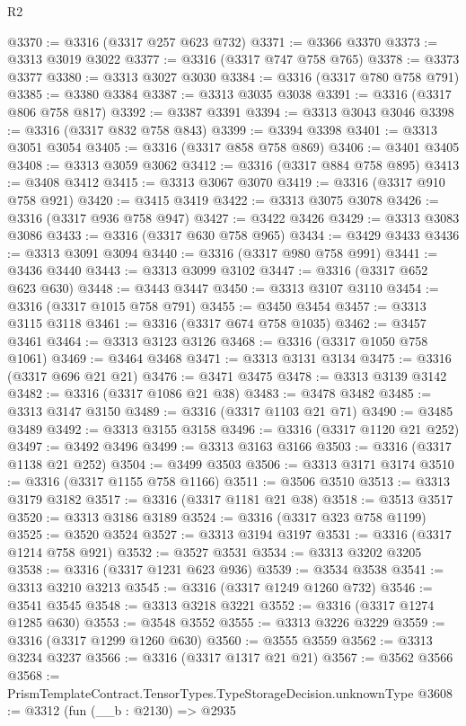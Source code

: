 \begin{lexlean}{R2}
\begin{coremodule}
@3370 := @3316 (@3317 @257 @623 @732)
@3371 := @3366 @3370
@3373 := @3313 @3019 @3022
@3377 := @3316 (@3317 @747 @758 @765)
@3378 := @3373 @3377
@3380 := @3313 @3027 @3030
@3384 := @3316 (@3317 @780 @758 @791)
@3385 := @3380 @3384
@3387 := @3313 @3035 @3038
@3391 := @3316 (@3317 @806 @758 @817)
@3392 := @3387 @3391
@3394 := @3313 @3043 @3046
@3398 := @3316 (@3317 @832 @758 @843)
@3399 := @3394 @3398
@3401 := @3313 @3051 @3054
@3405 := @3316 (@3317 @858 @758 @869)
@3406 := @3401 @3405
@3408 := @3313 @3059 @3062
@3412 := @3316 (@3317 @884 @758 @895)
@3413 := @3408 @3412
@3415 := @3313 @3067 @3070
@3419 := @3316 (@3317 @910 @758 @921)
@3420 := @3415 @3419
@3422 := @3313 @3075 @3078
@3426 := @3316 (@3317 @936 @758 @947)
@3427 := @3422 @3426
@3429 := @3313 @3083 @3086
@3433 := @3316 (@3317 @630 @758 @965)
@3434 := @3429 @3433
@3436 := @3313 @3091 @3094
@3440 := @3316 (@3317 @980 @758 @991)
@3441 := @3436 @3440
@3443 := @3313 @3099 @3102
@3447 := @3316 (@3317 @652 @623 @630)
@3448 := @3443 @3447
@3450 := @3313 @3107 @3110
@3454 := @3316 (@3317 @1015 @758 @791)
@3455 := @3450 @3454
@3457 := @3313 @3115 @3118
@3461 := @3316 (@3317 @674 @758 @1035)
@3462 := @3457 @3461
@3464 := @3313 @3123 @3126
@3468 := @3316 (@3317 @1050 @758 @1061)
@3469 := @3464 @3468
@3471 := @3313 @3131 @3134
@3475 := @3316 (@3317 @696 @21 @21)
@3476 := @3471 @3475
@3478 := @3313 @3139 @3142
@3482 := @3316 (@3317 @1086 @21 @38)
@3483 := @3478 @3482
@3485 := @3313 @3147 @3150
@3489 := @3316 (@3317 @1103 @21 @71)
@3490 := @3485 @3489
@3492 := @3313 @3155 @3158
@3496 := @3316 (@3317 @1120 @21 @252)
@3497 := @3492 @3496
@3499 := @3313 @3163 @3166
@3503 := @3316 (@3317 @1138 @21 @252)
@3504 := @3499 @3503
@3506 := @3313 @3171 @3174
@3510 := @3316 (@3317 @1155 @758 @1166)
@3511 := @3506 @3510
@3513 := @3313 @3179 @3182
@3517 := @3316 (@3317 @1181 @21 @38)
@3518 := @3513 @3517
@3520 := @3313 @3186 @3189
@3524 := @3316 (@3317 @323 @758 @1199)
@3525 := @3520 @3524
@3527 := @3313 @3194 @3197
@3531 := @3316 (@3317 @1214 @758 @921)
@3532 := @3527 @3531
@3534 := @3313 @3202 @3205
@3538 := @3316 (@3317 @1231 @623 @936)
@3539 := @3534 @3538
@3541 := @3313 @3210 @3213
@3545 := @3316 (@3317 @1249 @1260 @732)
@3546 := @3541 @3545
@3548 := @3313 @3218 @3221
@3552 := @3316 (@3317 @1274 @1285 @630)
@3553 := @3548 @3552
@3555 := @3313 @3226 @3229
@3559 := @3316 (@3317 @1299 @1260 @630)
@3560 := @3555 @3559
@3562 := @3313 @3234 @3237
@3566 := @3316 (@3317 @1317 @21 @21)
@3567 := @3562 @3566
@3568 := PrismTemplateContract.TensorTypes.TypeStorageDecision.unknownType
@3608 := @3312
    (fun (__b : @2130) =>
    @2935

\end{coremodule}
\end{lexlean}
